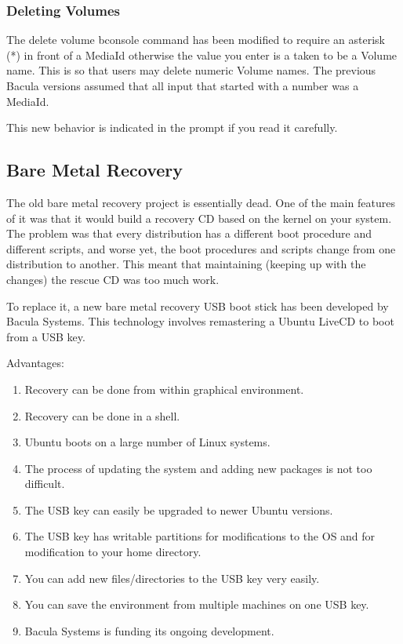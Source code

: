 \subsubsection{Deleting Volumes}
The delete volume bconsole command has been modified to
require an asterisk (*) in front of a MediaId otherwise the
value you enter is a taken to be a Volume name. This is so that
users may delete numeric Volume names. The previous Bacula versions
assumed that all input that started with a number was a MediaId.

This new behavior is indicated in the prompt if you read it
carefully.

\subsection{Bare Metal Recovery}
The old bare metal recovery project is essentially dead. One
of the main features of it was that it would build a recovery
CD based on the kernel on your system. The problem was that
every distribution has a different boot procedure and different 
scripts, and worse yet, the boot procedures and scripts change
from one distribution to another.  This meant that maintaining
(keeping up with the changes) the rescue CD was too much work.

To replace it, a new bare metal recovery USB boot stick has been developed
by Bacula Systems.  This technology involves remastering a Ubuntu LiveCD to
boot from a USB key.  

Advantages: 
\begin{enumerate} 
\item Recovery can be done from within graphical environment.  
\item Recovery can be done in a shell.  
\item Ubuntu boots on a large number of Linux systems.  
\item The process of updating the system and adding new
   packages is not too difficult. 
\item The USB key can easily be upgraded to newer Ubuntu versions.
\item The USB key has writable partitions for modifications to
   the OS and for modification to your home directory.
\item You can add new files/directories to the USB key very easily.
\item You can save the environment from multiple machines on
   one USB key.
\item Bacula Systems is funding its ongoing development.
\end{enumerate}

